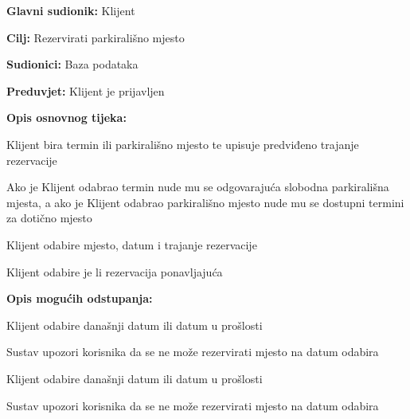 \noindent {}
\begin{packed_item}
	
	\item \textbf{Glavni sudionik: }Klijent
	\item  \textbf{Cilj:} Rezervirati parkirališno mjesto
	\item  \textbf{Sudionici:} Baza podataka
	\item  \textbf{Preduvjet:} Klijent je prijavljen
	\item  \textbf{Opis osnovnog tijeka:}
	
	\item[] \begin{packed_enum}
		
		\item Klijent bira termin ili parkirališno mjesto te upisuje predviđeno trajanje rezervacije
		\item Ako je Klijent odabrao termin nude mu se odgovarajuća slobodna parkirališna mjesta, a ako je Klijent odabrao parkirališno mjesto nude mu se dostupni termini za dotično mjesto
		\item Klijent odabire mjesto, datum i trajanje rezervacije
		\item Klijent odabire je li rezervacija ponavljajuća
		
	\end{packed_enum}
	
	\item  \textbf{Opis mogućih odstupanja:}
	
	\item[] \begin{packed_item}
		
		\item[1.a] Klijent odabire današnji datum ili datum u prošlosti
		\item[] \begin{packed_enum}
			
			\item Sustav upozori korisnika da se ne može rezervirati mjesto na datum odabira
			
			
		\end{packed_enum}
		
		\item[3.a] Klijent odabire današnji datum ili datum u prošlosti
		\item[] \begin{packed_enum}
			
			\item Sustav upozori korisnika da se ne može rezervirati mjesto na datum odabira
			
			
		\end{packed_enum}
		
		
	\end{packed_item}	
	
\end{packed_item}

